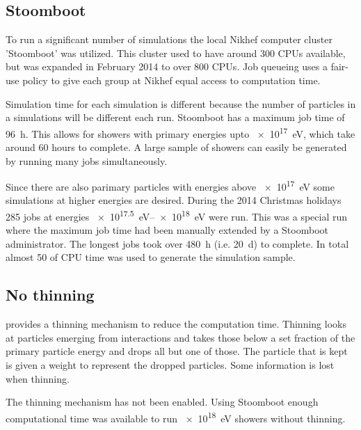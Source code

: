 \subsection{Stoomboot}

To run a significant number of simulations the local Nikhef computer
cluster 'Stoomboot' was utilized. This cluster used to have around 300
CPUs available, but was expanded in February 2014 to over 800 CPUs. Job
queueing uses a fair-use policy to give each group at Nikhef equal
access to computation time.

Simulation time for each simulation is different because the number of
particles in a simulations will be different each run. Stoomboot has a
maximum job time of \SI{96}{\hour}. This allows for showers with primary
energies upto \SI{e17}{\eV}, which take around 60 hours to
complete. A large sample of showers can easily be generated by running
many jobs simultaneously.

Since there are also parimary particles with energies above
\SI{e17}{\eV} some simulations at higher energies are desired.
During the 2014 Christmas holidays 285 jobs at energies
\SIrange{e17.5}{e18}{\eV} were run. This was a special run
where the maximum job time had been manually extended by a Stoomboot
administrator. The longest jobs took over \SI{480}{\hour} (i.e.
\SI{20}{\day}) to complete. In total almost \SI{50}{\year} of CPU time
was used to generate the simulation sample.

\begin{figure} \centering 
\caption{}
\label{fig:simulations_shower_walltime} \end{figure}


\subsection{No thinning}

\corsika provides a thinning mechanism to reduce the computation time.
Thinning looks at particles emerging from interactions and takes those
below a set fraction of the primary particle energy and drops all but
one of those. The particle that is kept is given a weight to represent
the dropped particles. Some information is lost when thinning.

The thinning mechanism has not been enabled. Using Stoomboot enough
computational time was available to run \SI{e18}{\eV} showers
without thinning.

